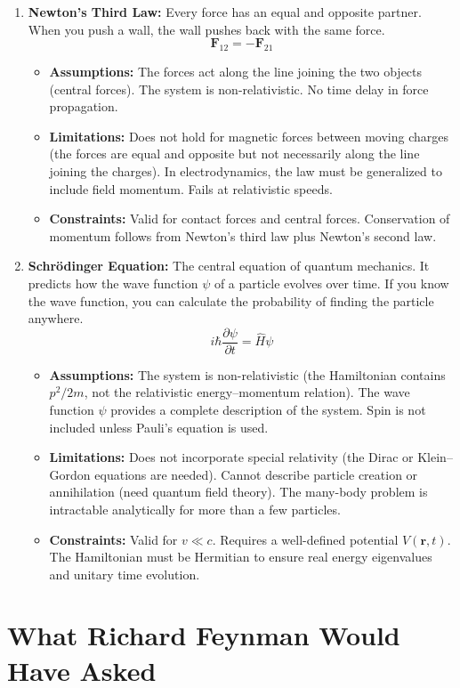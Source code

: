 \begin{enumerate}
\item \textbf{Newton's Third Law:} Every force has an equal and opposite partner. When you push a wall, the wall pushes back with the same force.
\[
\mathbf F_{12}=-\mathbf F_{21}
\]
\begin{itemize}
\item \textbf{Assumptions:} The forces act along the line joining the two objects (central forces). The system is non-relativistic. No time delay in force propagation.
\item \textbf{Limitations:} Does not hold for magnetic forces between moving charges (the forces are equal and opposite but not necessarily along the line joining the charges). In electrodynamics, the law must be generalized to include field momentum. Fails at relativistic speeds.
\item \textbf{Constraints:} Valid for contact forces and central forces. Conservation of momentum follows from Newton's third law plus Newton's second law.
\end{itemize}

\item \textbf{Schr\"odinger Equation:} The central equation of quantum mechanics. It predicts how the wave function $\psi$ of a particle evolves over time. If you know the wave function, you can calculate the probability of finding the particle anywhere.
\[
i\hbar\frac{\partial\psi}{\partial t}=\hat H\psi
\]
\begin{itemize}
\item \textbf{Assumptions:} The system is non-relativistic (the Hamiltonian contains $p^2/2m$, not the relativistic energy--momentum relation). The wave function $\psi$ provides a complete description of the system. Spin is not included unless Pauli's equation is used.
\item \textbf{Limitations:} Does not incorporate special relativity (the Dirac or Klein--Gordon equations are needed). Cannot describe particle creation or annihilation (need quantum field theory). The many-body problem is intractable analytically for more than a few particles.
\item \textbf{Constraints:} Valid for $v\ll c$. Requires a well-defined potential $V(\mathbf r,t)$. The Hamiltonian must be Hermitian to ensure real energy eigenvalues and unitary time evolution.
\end{itemize}

\end{enumerate}

\section*{What Richard Feynman Would Have Asked}

